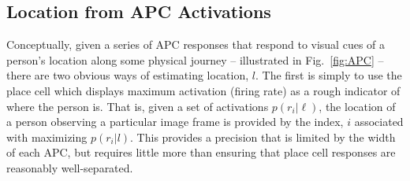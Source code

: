 %
%
%
%
%
%



\subsection{Location from APC Activations}
Conceptually, given a series of APC responses that respond to visual cues of a person's location along some physical journey -- illustrated in Fig.~\ref{fig:APC} -- there are two obvious ways of estimating location, $l$.  The first is simply to use the place cell which displays maximum activation (firing rate) as a rough indicator of where the person is. That is, given a set of activations $p(r_i|\ell)$, the location of a person observing a particular image frame is provided by the index, $i$ associated with maximizing $p(r_i|l)$. This provides a precision that is limited by the width of each APC, but requires little more than ensuring that place cell responses are reasonably well-separated. 

